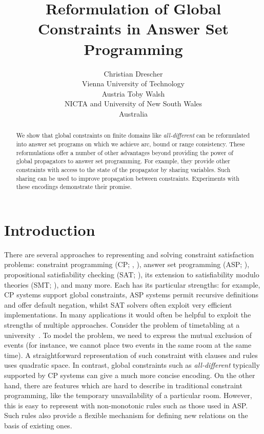 \documentclass[letterpaper]{article}
\title{Reformulation of Global Constraints in Answer Set Programming}
\author{
Christian Drescher \\
Vienna University of Technology \\
Austria
\And
Toby Walsh \\
NICTA and University of New South Wales \\
Australia
}
\newcommand{\citeay}[1]{\citeauthor{#1} \citeyear{#1}}
\begin{document}
\maketitle

\begin{abstract}
We show that global constraints on finite domains like \emph{all-different} can be reformulated into answer set programs on which we achieve arc, bound or range consistency.
These reformulations offer a number of other 
advantages beyond providing the power of global
propagators to answer set programming. For example,
they provide other constraints with access to the state of the propagator by sharing variables. Such sharing can be used to improve propagation between constraints. Experiments with these encodings demonstrate their promise.
\end{abstract}

\section{Introduction}


There are several approaches to representing and solving constraint satisfaction problems: constraint programming (CP; \citeay{dechter03}, \citeay{robewa06a}), answer set programming (ASP; \citeay{baral03}), propositional satisfiability checking (SAT; \citeay{bihemawa09a}), its extension to satisfiability modulo theories (SMT; \citeay{niolti06a}), and many more. Each has its particular strengths: for example, CP systems support global constraints, ASP systems permit recursive definitions and offer default negation, whilst SAT solvers often exploit very efficient implementations. In many applications it would often be helpful to exploit the strengths of multiple approaches. Consider the problem of timetabling at a university~\cite{jaoijani09a}.  To model the problem, we need to express the mutual exclusion of events (for instance, 
we cannot place two events in the same room at the same time). A
straightforward representation of such constraint with clauses and rules uses
quadratic space. In contrast, global constraints such as \emph{all-different} typically supported by CP systems can give a much more concise encoding. On the other hand, there are features which are hard to describe in traditional constraint programming, like the temporary unavailability of a particular room. However, this is easy to represent with non-monotonic rules such as those used in ASP. Such rules also provide a flexible mechanism for defining new relations on the basis of existing ones.
\end{document}

